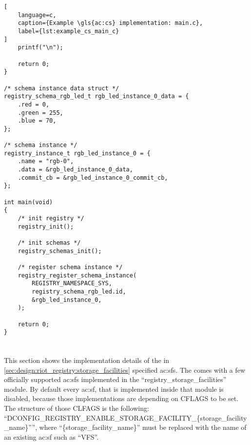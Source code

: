 {\begin{lstlisting}[
    language=c,
    caption={Example \gls{ac:cs} implementation: main.c},
    label={lst:example_cs_main_c}
]
    printf("\n");
    
    return 0;
}

/* schema instance data struct */
registry_schema_rgb_led_t rgb_led_instance_0_data = {
    .red = 0,
    .green = 255,
    .blue = 70,
};

/* schema instance */
registry_instance_t rgb_led_instance_0 = {
    .name = "rgb-0",
    .data = &rgb_led_instance_0_data,
    .commit_cb = &rgb_led_instance_0_commit_cb,
};

int main(void)
{
    /* init registry */
    registry_init();

    /* init schemas */
    registry_schemas_init();

    /* register schema instance */
    registry_register_schema_instance(
        REGISTRY_NAMESPACE_SYS,
        registry_schema_rgb_led.id,
        &rgb_led_instance_0,
    );

    return 0;
}
\end{lstlisting}

\section{}

This section shows the implementation details of the in \autoref{sec:design:riot_registry:storage_facilities} specified \glspl{ac:sf}.
The  comes with a few officially supported \glspl{ac:sf} implemented in the ``registry\_storage\_facilities'' module.
By default every \gls{ac:sf}, that is implemented inside that module is disabled, because those implementations are depending on CFLAGS to be set.
The structure of those CLFAGS is the following: ``DCONFIG\_REGISTRY\_ENABLE\_STORAGE\_FACILITY\_\{storage\_facility\_name\}”'', where ``\{storage\_facility\_name\}'' must be replaced with the name of an existing \gls{ac:sf} such as ``VFS''.

}
